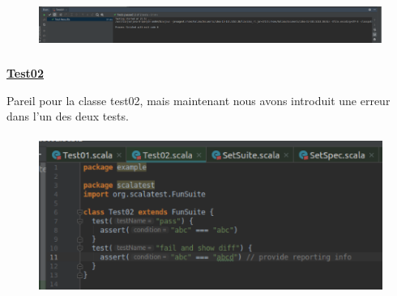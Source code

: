 \documentclass[12pt]{article}
\begin{document}

\begin{figure}[H]
	\begin{Center}
		\includegraphics[width=6.3in,height=0.66in]{./media/image23.png}
	\end{Center}
\end{figure}



\par

\begin{justify}
{\fontsize{14pt}{16.8pt}\selectfont \textbf{\uline{Test02}}\par}
\end{justify}\par

\begin{justify}
Pareil pour la classe test02, mais maintenant nous avons introduit une erreur dans l’un des deux tests.
\end{justify}\par




\begin{figure}[H]
	\begin{Center}
		\includegraphics[width=4.7in,height=2.04in]{./media/image24.png}
	\end{Center}
\end{figure}



\par
\end{document}
